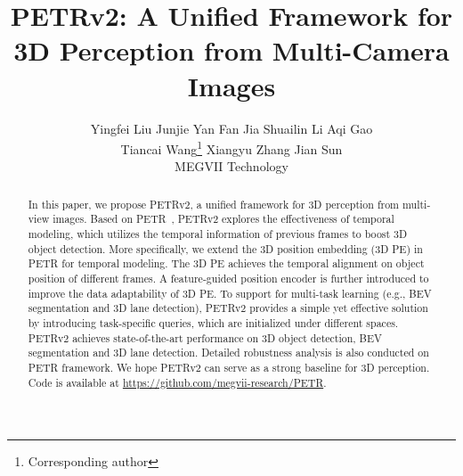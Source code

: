 \documentclass[10pt,twocolumn,letterpaper]{article}
\begin{document}
\title{PETRv2: A Unified Framework for 3D Perception from Multi-Camera Images}



\author{Yingfei Liu  \qquad Junjie Yan  \qquad Fan Jia \qquad Shuailin Li \qquad Aqi Gao \\ Tiancai Wang\thanks{Corresponding author} \qquad Xiangyu Zhang \qquad Jian Sun \vspace{1mm}\\ MEGVII Technology\\
}

\maketitle

\begin{abstract}  
In this paper, we propose PETRv2, a unified framework for 3D perception from multi-view images.
Based on PETR~\cite{liu2022petr}, PETRv2 explores the effectiveness of temporal modeling, which utilizes the temporal information of previous frames to boost 3D object detection. More specifically, we extend the 3D position embedding (3D PE) in PETR for temporal modeling. The 3D PE achieves the temporal alignment on object position of different frames. A feature-guided position encoder is further introduced to improve the data adaptability of 3D PE. To support for multi-task learning (e.g., BEV segmentation and 3D lane detection), PETRv2 provides a simple yet effective solution by introducing task-specific queries, which are initialized under different spaces. PETRv2 achieves state-of-the-art performance on 3D object detection, BEV segmentation and 3D lane detection. Detailed robustness analysis is also conducted on PETR framework. We hope PETRv2 can serve as a strong baseline for 3D perception. Code is available at \url{https://github.com/megvii-research/PETR}.
\end{abstract}
\end{document}
